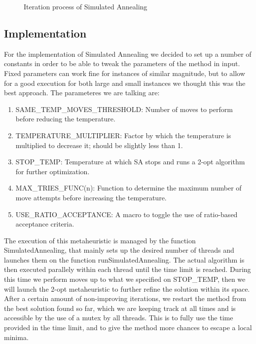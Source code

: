 \begin{figure}[H]
    \caption{Iteration process of Simulated Annealing}
    \label{fig:sa}
\end{figure}

\subsection{Implementation}
For the implementation of Simulated Annealing we decided to set up a number of constants in order to be able to tweak the parameters of the 
method in input. Fixed parameters can work fine for instances of similar magnitude, but to allow for a good execution for both large and small 
instances we thought this was the best approach. The parameteres we are talking are:

\begin{enumerate}
    \item SAME\_TEMP\_MOVES\_THRESHOLD: Number of moves to perform before reducing the temperature.
    \item TEMPERATURE\_MULTIPLIER: Factor by which the temperature is multiplied to decrease it; should be slightly less than 1.
    \item STOP\_TEMP: Temperature at which SA stops and runs a 2-opt algorithm for further optimization.
    \item MAX\_TRIES\_FUNC(n): Function to determine the maximum number of move attempts before increasing the temperature.
    \item USE\_RATIO\_ACCEPTANCE: A macro to toggle the use of ratio-based acceptance criteria.
\end{enumerate}


The execution of this metaheuristic is managed by the function SimulatedAnnealing, that mainly sets up the desired number of threads and launches them 
on the function runSimulatedAnnealing. 
The actual algorithm is then executed parallely within each thread until the time limit is reached. During this time we perform moves up to what we 
specified on STOP\_TEMP, then we will launch the 2-opt metaheuristic to further refine the solution within its space. 
After a certain amount of non-improving iterations, we restart the method from the best solution found so far, which we are keeping track at all 
times and is accessible by the use of a mutex by all threads. This is to fully use the time provided in the time limit, and to give the method more chances to escape a local minima.

